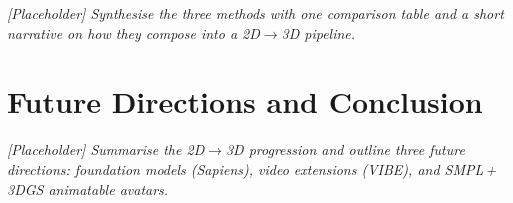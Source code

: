 \documentclass[11pt]{article}
\begin{document}
\textit{[Placeholder] Synthesise the three methods with one comparison table
and a short narrative on how they compose into a 2D$\to$3D pipeline.}

\section{Future Directions and Conclusion}
\textit{[Placeholder] Summarise the 2D$\to$3D progression and outline three
future directions: foundation models (Sapiens), video extensions (VIBE), and
SMPL\,+\,3DGS animatable avatars.}


\nocite{cao2019openpose,sun2019hrnet,kanazawa2018hmr}

{\footnotesize


}
\end{document}
